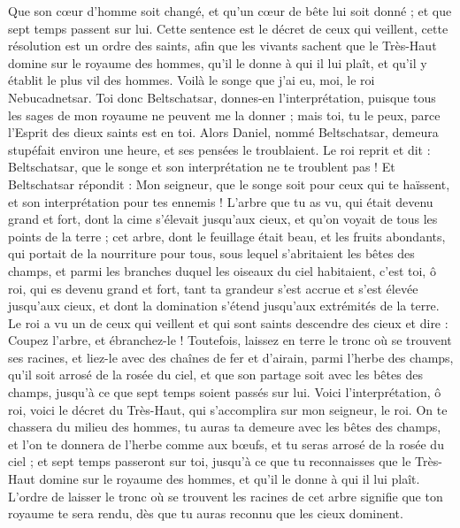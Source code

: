 \begin{multicols}{2}
Que son cœur d'homme soit changé, et qu'un cœur de bête lui soit donné ; et que sept temps passent sur lui.
Cette sentence est le décret de ceux qui veillent, cette résolution est un ordre des saints, afin que les vivants sachent que le Très-Haut domine sur le royaume des hommes, qu'il le donne à qui il lui plaît, et qu'il y établit le plus vil des hommes.
Voilà le songe que j'ai eu, moi, le roi Nebucadnetsar. Toi donc Beltschatsar, donnes-en l'interprétation, puisque tous les sages de mon royaume ne peuvent me la donner ; mais toi, tu le peux, parce l'Esprit des dieux saints est en toi.
Alors Daniel, nommé Beltschatsar, demeura stupéfait environ une heure, et ses pensées le troublaient. Le roi reprit et dit : Beltschatsar, que le songe et son interprétation ne te troublent pas ! Et Beltschatsar répondit : Mon seigneur, que le songe soit pour ceux qui te haïssent, et son interprétation pour tes ennemis !
L'arbre que tu as vu, qui était devenu grand et fort, dont la cime s'élevait jusqu'aux cieux, et qu'on voyait de tous les points de la terre ;
cet arbre, dont le feuillage était beau, et les fruits abondants, qui portait de la nourriture pour tous, sous lequel s'abritaient les bêtes des champs, et parmi les branches duquel les oiseaux du ciel habitaient,
c'est toi, ô roi, qui es devenu grand et fort, tant ta grandeur s'est accrue et s'est élevée jusqu'aux cieux, et dont la domination s'étend jusqu'aux extrémités de la terre.
Le roi a vu un de ceux qui veillent et qui sont saints descendre des cieux et dire : Coupez l'arbre, et ébranchez-le ! Toutefois, laissez en terre le tronc où se trouvent ses racines, et liez-le avec des chaînes de fer et d'airain, parmi l'herbe des champs, qu'il soit arrosé de la rosée du ciel, et que son partage soit avec les bêtes des champs, jusqu'à ce que sept temps soient passés sur lui.
Voici l'interprétation, ô roi, voici le décret du Très-Haut, qui s'accomplira sur mon seigneur, le roi.
On te chassera du milieu des hommes, tu auras ta demeure avec les bêtes des champs, et l'on te donnera de l'herbe comme aux bœufs, et tu seras arrosé de la rosée du ciel ; et sept temps passeront sur toi, jusqu'à ce que tu reconnaisses que le Très-Haut domine sur le royaume des hommes, et qu'il le donne à qui il lui plaît.
L'ordre de laisser le tronc où se trouvent les racines de cet arbre signifie que ton royaume te sera rendu, dès que tu auras reconnu que les cieux dominent.

\end{multicols}
